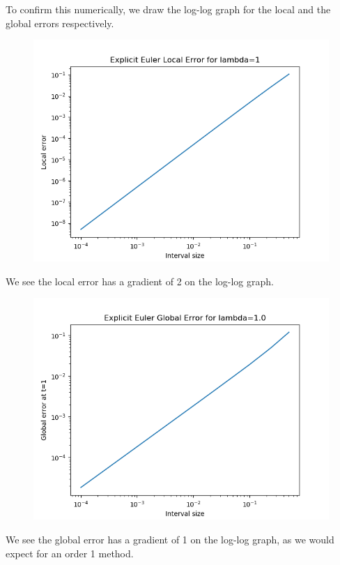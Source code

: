 \documentclass{article}
\begin{document}
\begin{itemize}
		To confirm this
		numerically, we draw the log-log graph for the local and
		the global errors respectively.

		\begin{figure}[H]
			\includegraphics[scale=0.6]{loglog1a1}
		\end{figure}
		We see the local error has a gradient of 2 on the log-log graph.

		\begin{figure}[H]
			\includegraphics[scale=0.6]{loglog1a1global}
		\end{figure}
		We see the global error has a gradient of 1 on the log-log
		graph, as we would expect for an order 1 method.


\end{itemize}
\end{document}
